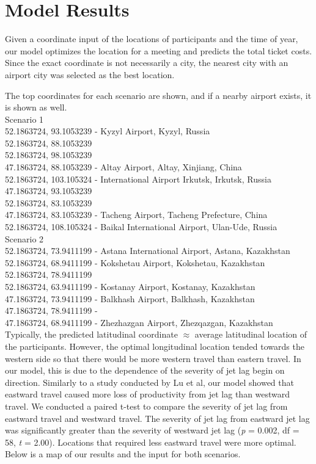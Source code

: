 \section{Model Results}
	Given a coordinate input of the locations of participants and the time of year, our model optimizes the location for a meeting and predicts the total ticket costs. Since the exact coordinate is not necessarily a city, the nearest city with an airport city was selected as the best location. 

The top coordinates for each scenario are shown, and if a nearby airport exists, it is shown as well.\\


Scenario 1\\
52.1863724, 93.1053239 - Kyzyl Airport, Kyzyl, Russia\\
52.1863724, 88.1053239\\
52.1863724, 98.1053239\\
47.1863724, 88.1053239 - Altay Airport, Altay, Xinjiang, China\\
52.1863724, 103.105324 - International Airport Irkutsk, Irkutsk, Russia\\
47.1863724, 93.1053239\\
52.1863724, 83.1053239\\
47.1863724, 83.1053239 - Tacheng Airport, Tacheng Prefecture, China\\
52.1863724, 108.105324 - Baikal International Airport, Ulan-Ude, Russia\\

Scenario 2\\
52.1863724, 73.9411199 - Astana International Airport, Astana, Kazakhstan\\
52.1863724, 68.9411199 - Kokshetau Airport, Kokshetau, Kazakhstan\\
52.1863724, 78.9411199\\
52.1863724, 63.9411199 - Kostanay Airport, Kostanay, Kazakhstan\\
47.1863724, 73.9411199 - Balkhash Airport, Balkhash, Kazakhstan\\
47.1863724, 78.9411199 - \\
47.1863724, 68.9411199 - Zhezhazgan Airport, Zhezqazgan, Kazakhstan\\

	Typically, the predicted latitudinal coordinate $\approx$ average latitudinal location of the participants. However, the optimal longitudinal location tended towards the western side so that there would be more western travel than eastern travel. In our model, this is due to the dependence of the severity of jet lag begin on direction. Similarly to a study conducted by Lu et al, our model showed that eastward travel caused more loss of productivity from jet lag than westward travel. We conducted a paired t-test to compare the severity of jet lag from eastward travel and westward travel. The severity of jet lag from eastward jet lag was significantly greater than the severity of westward jet lag (\textit{p} = 0.002, df = 58, \textit{t} = 2.00). Locations that required less eastward travel were more optimal. 
	Below is a map of our results and the input for both scenarios. 

